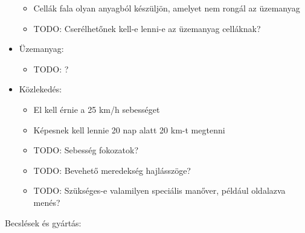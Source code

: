 \documentclass[12pt]{report}
\begin{document}
\begin{itemize}
\begin{itemize}
            \item Cellák fala olyan anyagból készüljön, amelyet nem rongál az üzemanyag
            \item TODO: Cserélhetőnek kell-e lenni-e az üzemanyag celláknak?
        \end{itemize}
    \item Üzemanyag:
        \begin{itemize}
            \item TODO: ?
        \end{itemize}
    \item Közlekedés:
        \begin{itemize}
            \item El kell érnie a  25 km/h sebességet
            \item Képesnek kell lennie 20 nap alatt 20 km-t megtenni
            \item TODO: Sebesség fokozatok?
            \item TODO: Bevehető meredekség hajlásszöge?
            \item TODO: Szükséges-e valamilyen speciális manőver, például oldalazva menés?
        \end{itemize}
\end{itemize}


Becslések és gyártás:
\end{document}
